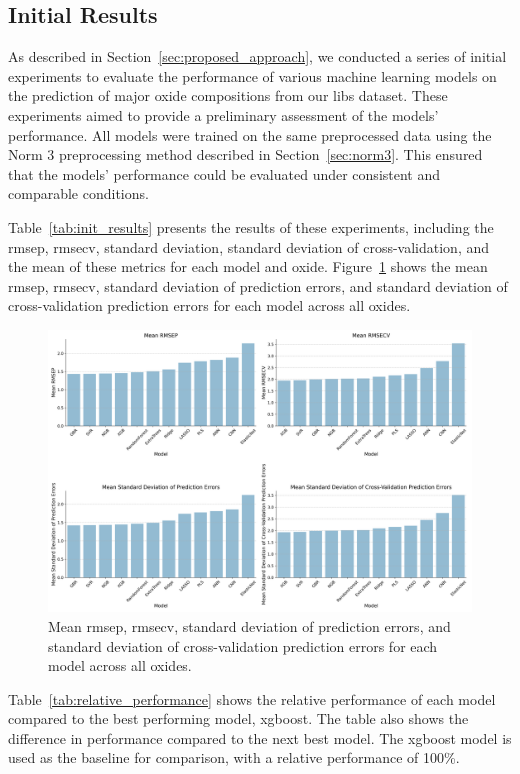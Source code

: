 \subsection{Initial Results}
As described in Section~\ref{sec:proposed_approach}, we conducted a series of initial experiments to evaluate the performance of various machine learning models on the prediction of major oxide compositions from our \gls{libs} dataset.
These experiments aimed to provide a preliminary assessment of the models' performance.
All models were trained on the same preprocessed data using the Norm 3 preprocessing method described in Section~\ref{sec:norm3}.
This ensured that the models' performance could be evaluated under consistent and comparable conditions.

Table~\ref{tab:init_results} presents the results of these experiments, including the \gls{rmsep}, \gls{rmsecv}, standard deviation, standard deviation of cross-validation, and the mean of these metrics for each model and oxide.
Figure~\ref{fig:init_results_rmses} shows the mean \gls{rmsep}, \gls{rmsecv}, standard deviation of prediction errors, and standard deviation of cross-validation prediction errors for each model across all oxides.

\begin{figure}[h]
    \centering
    \includegraphics[width=\textwidth]{images/init_results_means.png}
    \caption{Mean \gls{rmsep}, \gls{rmsecv}, standard deviation of prediction errors, and standard deviation of cross-validation prediction errors for each model across all oxides.}
    \label{fig:init_results_rmses}
\end{figure}

Table~\ref{tab:relative_performance} shows the relative performance of each model compared to the best performing model, \gls{xgboost}.
The table also shows the difference in performance compared to the next best model.
The \gls{xgboost} model is used as the baseline for comparison, with a relative performance of 100\%.

